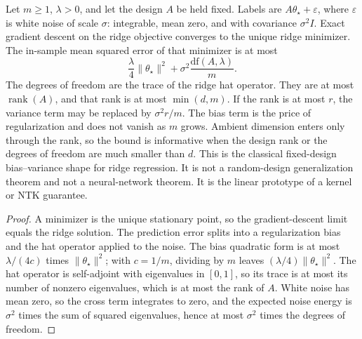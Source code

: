 \begin{lemma}\label{lem:ridge_risk}
\leanok
{}
Let $m\geq 1$, $\lambda>0$, and let the design $A$ be held fixed. Labels are
$A\theta_\star+\varepsilon$, where $\varepsilon$ is white noise of scale $\sigma$:
integrable, mean zero, and with covariance $\sigma^2 I$. Exact gradient descent
on the ridge objective converges to the unique ridge minimizer. The in-sample
mean squared error of that minimizer is at most
\[
\frac{\lambda}{4}\|\theta_\star\|^2+\sigma^2\frac{\mathrm{df}(A,\lambda)}{m}.
\]
The degrees of freedom are the trace of the ridge hat operator. They are at most
$\operatorname{rank}(A)$, and that rank is at most $\min(d,m)$. If the rank is
at most $r$, the variance term may be replaced by $\sigma^2 r/m$. The bias term
is the price of regularization and does not vanish as $m$ grows. Ambient
dimension enters only through the rank, so the bound is informative when the
design rank or the degrees of freedom are much smaller than $d$. This is the
classical fixed-design bias--variance shape for ridge regression. It is not a
random-design generalization theorem and not a neural-network theorem. It is
the linear prototype of a kernel or NTK guarantee.
\end{lemma}
\begin{proof}
\leanok
A minimizer is the unique stationary point, so the gradient-descent limit equals
the ridge solution. The prediction error splits into a regularization bias and
the hat operator applied to the noise. The bias quadratic form is at most
$\lambda/(4c)$ times $\|\theta_\star\|^2$; with $c=1/m$, dividing by $m$ leaves
$(\lambda/4)\|\theta_\star\|^2$. The hat operator is self-adjoint with
eigenvalues in $[0,1]$, so its trace is at most its number of nonzero
eigenvalues, which is at most the rank of $A$. White noise has mean zero, so
the cross term integrates to zero, and the expected noise energy is $\sigma^2$
times the sum of squared eigenvalues, hence at most $\sigma^2$ times the
degrees of freedom.
\end{proof}

